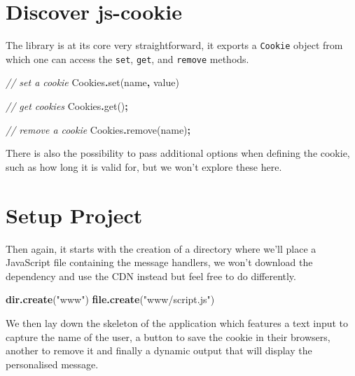 \documentclass[
]{krantz}
\makeatletter
\newenvironment{Shaded}{\begin{snugshade}}{\end{snugshade}}
\newcommand{\CommentTok}[1]{\textcolor[rgb]{0.37,0.37,0.37}{\textit{#1}}}
\newcommand{\FunctionTok}[1]{\textcolor[rgb]{0,0,0}{#1}}
\newcommand{\KeywordTok}[1]{\textcolor[rgb]{0.27,0.27,0.27}{\textbf{#1}}}
\newcommand{\NormalTok}[1]{#1}
\newcommand{\OperatorTok}[1]{\textcolor[rgb]{0.43,0.43,0.43}{\textbf{#1}}}
\newcommand{\StringTok}[1]{\textcolor[rgb]{0.5,0.5,0.5}{#1}}
\newenvironment{kframe}{%
\medskip{}
\setlength{\fboxsep}{.8em}
 \def\at@end@of@kframe{}%
 \ifinner\ifhmode%
  \def\at@end@of@kframe{\end{minipage}}%
  \begin{minipage}{\columnwidth}%
 \fi\fi%
 \def\FrameCommand##1{\hskip\@totalleftmargin \hskip-\fboxsep
 \colorbox{shadecolor}{##1}\hskip-\fboxsep
     \hskip-\linewidth \hskip-\@totalleftmargin \hskip\columnwidth}%
 \MakeFramed {\advance\hsize-\width
   \@totalleftmargin\z@ \linewidth\hsize
   \@setminipage}}%
 {\par\unskip\endMakeFramed%
 \at@end@of@kframe}
\renewenvironment{Shaded}{\begin{kframe}}{\end{kframe}}
\makeatother
\begin{document}
\hypertarget{shiny-cookies-discover}{%
\section{Discover js-cookie}\label{shiny-cookies-discover}}

The library is at its core very straightforward, it exports a \texttt{Cookie} object from which one can access the \texttt{set}, \texttt{get}, and \texttt{remove} methods.

\begin{Shaded}
\begin{Highlighting}[]
\CommentTok{// set a cookie}
\NormalTok{Cookies}\OperatorTok{.}\FunctionTok{set}\NormalTok{(}\StringTok{\textquotesingle{}name\textquotesingle{}}\OperatorTok{,} \StringTok{\textquotesingle{}value\textquotesingle{}}\NormalTok{)}

\CommentTok{// get cookies}
\NormalTok{Cookies}\OperatorTok{.}\FunctionTok{get}\NormalTok{()}\OperatorTok{;}

\CommentTok{// remove a cookie}
\NormalTok{Cookies}\OperatorTok{.}\FunctionTok{remove}\NormalTok{(}\StringTok{\textquotesingle{}name\textquotesingle{}}\NormalTok{)}\OperatorTok{;}
\end{Highlighting}
\end{Shaded}

There is also the possibility to pass additional options when defining the cookie, such as how long it is valid for, but we won't explore these here.

\hypertarget{shiny-cookies-setup}{%
\section{Setup Project}\label{shiny-cookies-setup}}

Then again, it starts with the creation of a directory where we'll place a JavaScript file containing the message handlers, we won't download the dependency and use the CDN instead but feel free to do differently.

\begin{Shaded}
\begin{Highlighting}[]
\KeywordTok{dir.create}\NormalTok{(}\StringTok{"www"}\NormalTok{)}
\KeywordTok{file.create}\NormalTok{(}\StringTok{"www/script.js"}\NormalTok{)}
\end{Highlighting}
\end{Shaded}

We then lay down the skeleton of the application which features a text input to capture the name of the user, a button to save the cookie in their browsers, another to remove it and finally a dynamic output that will display the personalised message.
\end{document}
